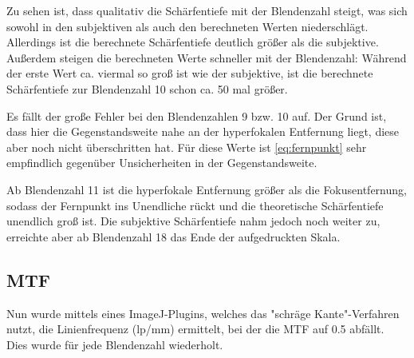 Zu sehen ist, dass qualitativ die Schärfentiefe mit der Blendenzahl steigt, was sich sowohl in den subjektiven als auch den berechneten Werten niederschlägt. Allerdings ist die berechnete Schärfentiefe deutlich größer als die subjektive. Außerdem steigen die berechneten Werte schneller mit der Blendenzahl: Während der erste Wert ca. viermal so groß ist wie der subjektive, ist die berechnete Schärfentiefe zur Blendenzahl \num{10} schon ca. 50 mal größer.

Es fällt der große Fehler bei den Blendenzahlen 9 bzw. 10 auf. Der Grund ist, dass hier die Gegenstandsweite nahe an der hyperfokalen Entfernung liegt, diese aber noch nicht überschritten hat. Für diese Werte ist \cref{eq:fernpunkt} sehr empfindlich gegenüber Unsicherheiten in der Gegenstandsweite.

Ab Blendenzahl \num{11} ist die hyperfokale Entfernung größer als die Fokusentfernung, sodass der Fernpunkt ins Unendliche rückt und die theoretische Schärfentiefe unendlich groß ist. Die subjektive Schärfentiefe nahm jedoch noch weiter zu, erreichte aber ab Blendenzahl \num{18} das Ende der aufgedruckten Skala.

\subsection{MTF}
Nun wurde mittels eines ImageJ-Plugins, welches das "schräge Kante"-Verfahren nutzt, die Linienfrequenz (lp/mm) ermittelt, bei der die MTF auf 0.5 abfällt. Dies wurde für jede Blendenzahl wiederholt.

